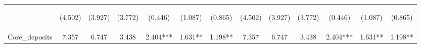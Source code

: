 \documentclass[]{article}
\begin{document}
\begin{center}
\begin{tabular}{lcccccccccccc}
\vspace{4pt} & \begin{footnotesize}(4.502)\end{footnotesize} & \begin{footnotesize}(3.927)\end{footnotesize} & \begin{footnotesize}(3.772)\end{footnotesize} & \begin{footnotesize}(0.446)\end{footnotesize} & \begin{footnotesize}(1.087)\end{footnotesize} & \begin{footnotesize}(0.865)\end{footnotesize} & \begin{footnotesize}(4.502)\end{footnotesize} & \begin{footnotesize}(3.927)\end{footnotesize} & \begin{footnotesize}(3.772)\end{footnotesize} & \begin{footnotesize}(0.446)\end{footnotesize} & \begin{footnotesize}(1.087)\end{footnotesize} & \begin{footnotesize}(0.865)\end{footnotesize} \\
Core\_deposits & 7.357 & 6.747 & 3.438 & 2.404*** & 1.631** & 1.198** & 7.357 & 6.747 & 3.438 & 2.404*** & 1.631** & 1.198** \\

\end{tabular}
\end{center}
\end{document}
